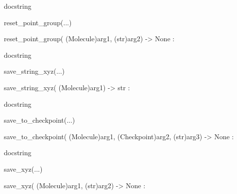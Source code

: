 \documentclass[letterpaper,10pt,english]{sphinxmanual}
\begin{document}
\begin{description}
\begin{description}
\begin{DUlineblock}{0em}
\begin{DUlineblock}{\DUlineblockindent}
\begin{DUlineblock}{\DUlineblockindent}
\item[] docstring
\item[] 
\end{DUlineblock}
\end{DUlineblock}
\item[] reset\_point\_group(...)
\item[]
\begin{DUlineblock}{\DUlineblockindent}
\item[] reset\_point\_group( (Molecule)arg1, (str)arg2) -\textgreater{} None :
\item[]
\begin{DUlineblock}{\DUlineblockindent}
\item[] docstring
\item[] 
\end{DUlineblock}
\end{DUlineblock}
\item[] save\_string\_xyz(...)
\item[]
\begin{DUlineblock}{\DUlineblockindent}
\item[] save\_string\_xyz( (Molecule)arg1) -\textgreater{} str :
\item[]
\begin{DUlineblock}{\DUlineblockindent}
\item[] docstring
\item[] 
\end{DUlineblock}
\end{DUlineblock}
\item[] save\_to\_checkpoint(...)
\item[]
\begin{DUlineblock}{\DUlineblockindent}
\item[] save\_to\_checkpoint( (Molecule)arg1, (Checkpoint)arg2, (str)arg3) -\textgreater{} None :
\item[]
\begin{DUlineblock}{\DUlineblockindent}
\item[] docstring
\item[] 
\end{DUlineblock}
\end{DUlineblock}
\item[] save\_xyz(...)
\item[]
\begin{DUlineblock}{\DUlineblockindent}
\item[] save\_xyz( (Molecule)arg1, (str)arg2) -\textgreater{} None :

\end{DUlineblock}
\end{DUlineblock}
\end{description}
\end{description}
\end{document}
